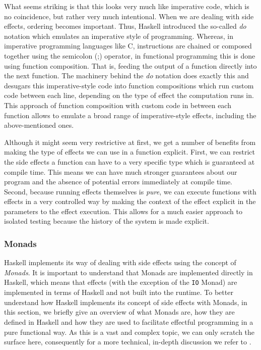 What seems striking is that this looks very much like imperative code, which is no coincidence, but rather very much intentional. When we are dealing with side effects, ordering becomes important. Thus, Haskell introduced the so-called \textit{do} notation which emulates an imperative style of programming. Whereas, in imperative programming languages like C, instructions are chained or composed together using the semicolon (;) operator, in functional programming this is done using function composition. That is, feeding the output of a function directly into the next function. The machinery behind the \textit{do} notation does exactly this and desugars this imperative-style code into function compositions which run custom code between each line, depending on the type of effect the computation runs in. This approach of function composition with custom code in between each function allows to emulate a broad range of imperative-style effects, including the above-mentioned ones.

Although it might seem very restrictive at first, we get a number of benefits from making the type of effects we can use in a function explicit. First, we can restrict the side effects a function can have to a very specific type which is guaranteed at compile time. This means we can have much stronger guarantees about our program and the absence of potential errors immediately at compile time. Second, because running effects themselves is \textit{pure}, we can execute functions with effects in a very controlled way by making the context of the effect explicit in the parameters to the effect execution. This allows for a much easier approach to isolated testing because the history of the system is made explicit. 

\subsubsection{Monads}
Haskell implements its way of dealing with side effects using the concept of \textit{Monads}. It is important to understand that Monads are implemented directly in Haskell, which means that effects (with the exception of the \texttt{IO} Monad) are implemented in terms of Haskell and not built into the runtime. To better understand how Haskell implements its concept of side effects with Monads, in this section, we briefly give an overview of what Monads are, how they are defined in Haskell and how they are used to facilitate effectful programming in a pure functional way. As this is a vast and complex topic, we can only scratch the surface here, consequently for a more technical, in-depth discussion we refer to \cite{jones_tackling_2002,moggi_computational_1989,wadler_essence_1992,wadler_monads_1995,wadler_how_1997}.

